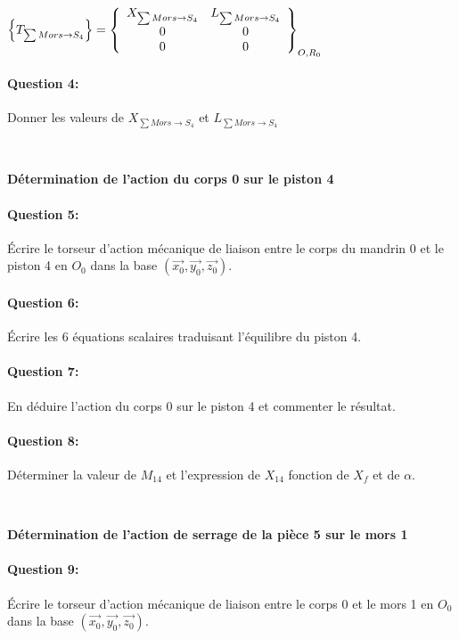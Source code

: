 $\left\{T_{\sum Mors \rightarrow S_4}\right\}=\left\{
  \begin{array}{c c}
  X_{\sum Mors \rightarrow S_4} & L_{\sum Mors \rightarrow S_4} \\
  0 & 0 \\
  0 & 0
  \end{array}\right\}_{O,R_0}$

\paragraph{Question 4:} Donner les valeurs de $X_{\sum Mors \rightarrow S_4}$ et $L_{\sum Mors \rightarrow S_4}$

~\

\textbf{Détermination de l'action du corps 0 sur le piston 4}

\paragraph{Question 5:} Écrire le torseur d'action mécanique de liaison entre le corps du mandrin 0 et le piston 4 en $O_0$ dans la base $(\overrightarrow{x_0},\overrightarrow{y_0},\overrightarrow{z_0})$. 
 
\paragraph{Question 6:} Écrire les 6 équations scalaires traduisant l'équilibre du piston 4. 

\paragraph{Question 7:} En déduire l'action du corps 0 sur le piston 4 et commenter le résultat. 

\paragraph{Question 8:} Déterminer la valeur de $M_{14}$ et l'expression de $X_{14}$ fonction de $X_f$ et de $\alpha$.

~\

\textbf{Détermination de l'action de serrage de la pièce 5 sur le mors 1}

\paragraph{Question 9:} Écrire le torseur d'action mécanique de liaison entre le corps 0 et le mors 1 en $O_0$ dans la base $(\overrightarrow{x_0},\overrightarrow{y_0},\overrightarrow{z_0})$. 

